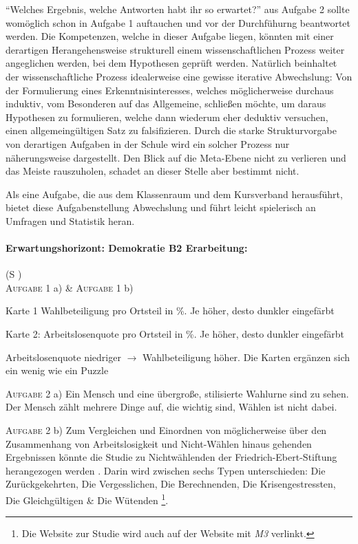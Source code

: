 \enquote{Welches Ergebnis, welche Antworten habt ihr so erwartet?} aus Aufgabe 2 sollte womöglich schon in Aufgabe 1 auftauchen und vor der Durchfühurng beantwortet werden. Die Kompetenzen, welche in dieser Aufgabe liegen, könnten mit einer derartigen Herangehensweise strukturell  einem wissenschaftlichen Prozess weiter angeglichen werden, bei dem Hypothesen geprüft werden. 
Natürlich beinhaltet der wissenschaftliche Prozess idealerweise eine gewisse iterative Abwechslung: Von der Formulierung eines Erkenntnisinteresses, welches möglicherweise durchaus induktiv, vom Besonderen auf das Allgemeine, schließen möchte, um daraus Hypothesen zu formulieren, welche dann wiederum eher deduktiv versuchen, einen allgemeingültigen Satz zu falsifizieren. Durch die starke Strukturvorgabe von derartigen Aufgaben in der Schule wird ein solcher Prozess nur näherungsweise dargestellt. Den Blick auf die Meta-Ebene nicht zu verlieren und das Meiste rauszuholen, schadet an dieser Stelle aber bestimmt nicht. 

Als eine Aufgabe, die aus dem Klassenraum und dem Kursverband herausführt, bietet diese Aufgabenstellung Abwechslung und führt leicht spielerisch an Umfragen und Statistik heran. 
\\



\paragraph{Erwartungshorizont: Demokratie B2 Erarbeitung:}  (\gls{S} \pageref{DEMOKRATIE-B2})
\\
\textsc{Aufgabe 1} a) \& \textsc{Aufgabe 1} b)
\begin{myitemize}
    \item Karte 1 Wahlbeteiligung pro Ortsteil in \%. Je höher, desto dunkler eingefärbt
    \item Karte 2: Arbeitslosenquote pro Ortsteil in \%. Je höher, desto dunkler eingefärbt 
    \item Arbeitslosenquote niedriger $\rightarrow$ Wahlbeteiligung höher. Die Karten ergänzen sich ein wenig wie ein Puzzle
\end{myitemize}

\textsc{Aufgabe 2} a) \quad Ein Mensch und eine übergroße, stilisierte Wahlurne sind zu sehen. Der Mensch zählt mehrere Dinge auf, die wichtig sind, Wählen ist nicht dabei.

\textsc{Aufgabe 2} b) \quad Zum Vergleichen und Einordnen von möglicherweise über den Zusammenhang von Arbeitslosigkeit und Nicht-Wählen hinaus gehenden Ergebnissen könnte die Studie zu Nichtwählenden der Friedrich-Ebert-Stiftung herangezogen werden \autocite[]{Hagemeyer.2023}. Darin wird zwischen sechs Typen unterschieden: Die Zurückgekehrten, Die Vergesslichen, Die Berechnenden, Die Krisengestressten, Die Gleichgültigen \& Die Wütenden \autocite[11-13]{Hagemeyer.2023}\footnote{Die Website zur Studie wird auch auf der Website mit \emph{M3} verlinkt.}. 
\\

